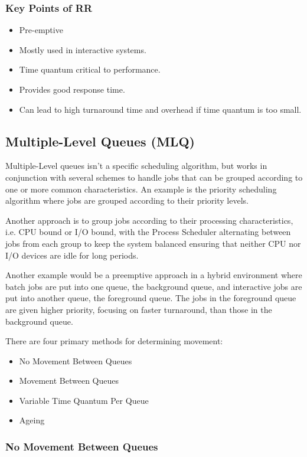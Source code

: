 \documentclass[12pt letter]{report}
\begin{document}
\subsubsection{Key Points of RR}
\begin{itemize}
  \item Pre-emptive
  \item Mostly used in interactive systems.
  \item Time quantum critical to performance.
  \item Provides good response time.
  \item Can lead to high turnaround time and overhead if time quantum
    is too small.
\end{itemize}

\subsection{Multiple-Level Queues (MLQ)}

Multiple-Level queues isn't a specific scheduling algorithm, but
works in conjunction with several schemes to handle jobs that can be
grouped according  to one or more common characteristics. An example
is the priority scheduling algorithm where jobs are grouped according to
their priority levels.

Another approach is to group jobs according to their processing
characteristics, i.e. CPU bound or I/O bound, with the Process
Scheduler alternating between jobs from each group to keep the system
balanced ensuring that neither CPU nor I/O devices are idle for long periods.

Another example would be a preemptive approach in a hybrid
environment where batch jobs are put into one queue, the background
queue, and interactive jobs are put into another queue, the
foreground queue. The jobs in the foreground queue are given higher
priority, focusing on faster turnaround, than those in the background queue.

There are four primary methods for determining movement:
\begin{itemize}
  \item No Movement Between Queues
  \item Movement Between Queues
  \item Variable Time Quantum Per Queue
  \item Ageing
\end{itemize}

\subsubsection{No Movement Between Queues}
\end{document}
